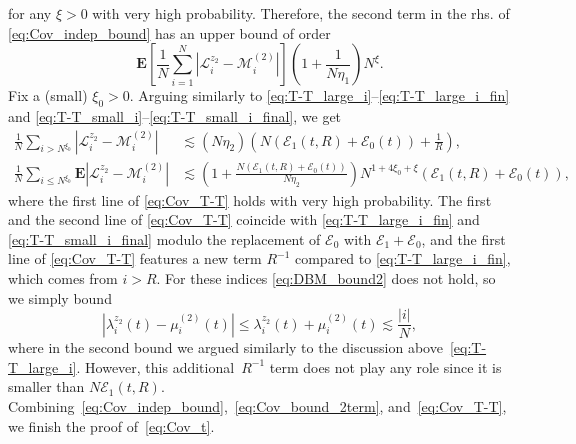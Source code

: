 \documentclass[10pt]{amsart}
\numberwithin{equation}{section}
\newcommand{\E}{\mathbf{E}}
\begin{document}
for any $\xi>0$ with very high probability. Therefore, the second term in the rhs. of \eqref{eq:Cov_indep_bound} has an upper bound of order
\begin{equation}
\E \left[\frac{1}{N}\sum_{i=1}^N \left\vert\mathscr{L}^{z_2}_i-\mathscr{M}^{(2)}_i\right\vert\right] \left(1+\frac{1}{N\eta_1}\right)N^\xi.
\label{eq:Cov_bound_2term}
\end{equation}
Fix a (small) $\xi_0>0$. Arguing similarly to \eqref{eq:T-T_large_i}--\eqref{eq:T-T_large_i_fin} and \eqref{eq:T-T_small_i}--\eqref{eq:T-T_small_i_final}, we get
\begin{equation}
\begin{split}
\frac{1}{N}\sum_{i> N^{\xi_0}} \left\vert \mathscr{L}_i^{z_2}-\mathscr{M}_i^{(2)}\right\vert &\lesssim  (N\eta_2)\left(N(\mathcal{E}_1(t,R) + \mathcal{E}_0(t)) + \frac{1}{R}\right),\\
\frac{1}{N} \sum_{i\le N^{\xi_0}} \E \left\vert\mathscr{L}_i^{z_2}-\mathscr{M}_i^{(2)}\right\vert&\lesssim \left(1 + \frac{N\left(\mathcal{E}_1(t,R)+\mathcal{E}_0(t)\right)}{N\eta_2}\right)N^{1+4\xi_0+\xi}\left(\mathcal{E}_1(t,R)+\mathcal{E}_0(t)\right),
\end{split}
\label{eq:Cov_T-T}
\end{equation}
where the first line of \eqref{eq:Cov_T-T} holds with very high probability. The first and the second line of \eqref{eq:Cov_T-T} coincide with \eqref{eq:T-T_large_i_fin} and \eqref{eq:T-T_small_i_final} modulo the replacement of $\mathcal{E}_0$ with $\mathcal{E}_1+\mathcal{E}_0$, and the first line of \eqref{eq:Cov_T-T} features a new term $R^{-1}$ compared to \eqref{eq:T-T_large_i_fin}, which comes from $i>R$. For these indices \eqref{eq:DBM_bound2} does not hold, so we simply bound
\begin{equation}
|\lambda_i^{z_2}(t)-\mu_i^{(2)}(t)| \le \lambda_i^{z_2}(t) + \mu_i^{(2)}(t)\lesssim \frac{|i|}{N},
\end{equation}
where in the second bound we argued similarly to the discussion above~\eqref{eq:T-T_large_i}. However, this additional~$R^{-1}$ term does not play any role since it is smaller than $N\mathcal{E}_1(t,R)$. Combining~\eqref{eq:Cov_indep_bound},~\eqref{eq:Cov_bound_2term}, and~\eqref{eq:Cov_T-T}, we finish the proof of~\eqref{eq:Cov_t}.
\end{document}
